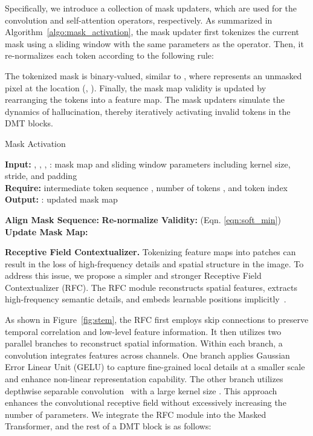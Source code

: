 \documentclass[10pt,twocolumn,letterpaper]{article}
\begin{document}
Specifically, we introduce a collection of mask updaters, which are used for the convolution and self-attention operators, respectively. As summarized in Algorithm~\ref{algo:mask_activation}, the mask updater first tokenizes the current mask using a sliding window with the same parameters as the operator. Then, it re-normalizes each token  according to the following rule:


The tokenized mask  is binary-valued, similar to , where  represents an unmasked pixel at the location (, ). Finally, the mask map validity is updated by rearranging the tokens into a feature map.
The mask updaters simulate the dynamics of hallucination, thereby iteratively activating invalid tokens in the DMT blocks.


\begin{algorithm}[b]
\small
\caption{Mask Activation}\label{algo:mask_activation}
 \noindent\textbf{Input:} , , , : mask map and sliding window parameters including kernel size, stride, and padding \\
 \noindent\textbf{Require:} intermediate token sequence , number of tokens , and token index    \\
 \noindent\textbf{Output:} : updated mask map
\begin{algorithmic}[1]

\State \textbf{Align Mask Sequence:}
  \State  
  \State 
\EndFor
\State \textbf{Re-normalize Validity:}
\State  (Eqn. \ref{eqn:soft_min})
\State \textbf{Update Mask Map:}
\State  
\EndFor
\State  
\end{algorithmic}
\end{algorithm}

 

{\noindent\bf Receptive Field Contextualizer.} 
Tokenizing feature maps into patches can result in the loss of high-frequency details and spatial structure in the image. To address this issue, we propose a simpler and stronger Receptive Field Contextualizer (RFC). The RFC module reconstructs spatial features, extracts high-frequency semantic details, and embeds learnable positions implicitly~\cite{wu2021cvt}.

As shown in Figure~\ref{fig:stem}, the RFC first employs skip connections to preserve temporal correlation and low-level feature information. It then utilizes two parallel branches to reconstruct spatial information. Within each branch, a  convolution integrates features across channels. One branch applies Gaussian Error Linear Unit (GELU) to capture fine-grained local details at a smaller scale and enhance non-linear representation capability. The other branch utilizes depthwise separable convolution~\cite{chollet2017xception} with a large kernel size . This approach enhances the convolutional receptive field without excessively increasing the number of parameters. We integrate the RFC module into the Masked Transformer, and the rest of a DMT block is as follows:
\end{document}
